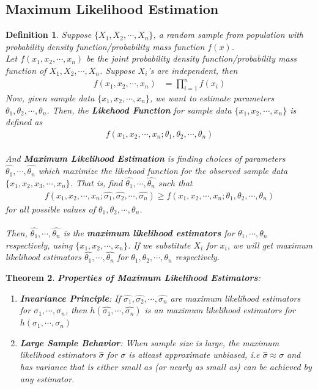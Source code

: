 \documentclass[11pt,oneside]{book}
\theoremstyle{newStyle}
\newtheorem{thm}{Theorem}[chapter]
\newtheorem{defn}[thm]{Definition}
\begin{document}
\subsection[Maximum Likelihood Estimation]{Maximum Likelihood Estimation}
\begin{defn}
Suppose $\{X_1,X_2,\cdots,X_n\}$, a random sample from population with probability density function/probability mass function $f(x)$.\\
Let $f(x_1,x_2,\cdots,x_n)$ be the joint probability density function/probability mass function of $X_1,X_2,\cdots,X_n$. Suppose $X_i$'s are independent, then \begin{align*}
f(x_1,x_2,\cdots,x_n)&=\prod_{i=1}^nf(x_i)
\end{align*} 
Now, given sample data $\{x_1,x_2,\cdots,x_n\}$, we want to estimate parameters $\theta_1,\theta_2,\cdots,\theta_n$. Then, the \textbf{Likehood Function} for sample data $\{x_1,x_2,\cdots,x_n\}$ is defined as \begin{align*}
f(x_1,x_2,\cdots,x_n;\theta_1,\theta_2,\cdots,\theta_n)
\end{align*}
\hfill\\
And \textbf{Maximum Likelihood Estimation} is finding choices of parameters $\widehat{\theta_1},\cdots,\widehat{\theta_n}$ which maximize the likehood function for the observed sample data $\{x_1,x_2,x_3,\cdots,x_n\}$. That is, find $\widehat{\theta_1},\cdots,\widehat{\theta_n}$ such that \begin{align*}
f(x_1,x_2,\cdots,x_n;\widehat{\sigma_1},\widehat{\sigma_2},\cdots,\widehat{\sigma_n})\geq f(x_1,x_2,\cdots,x_n;\theta_1,\theta_2,\cdots,\theta_n)
\end{align*}
for all possible values of $\theta_1,\theta_2,\cdots,\theta_n$.\\
\hfill\\
Then, $\widehat{\theta_1},\cdots,\widehat{\theta_n}$ is the \textbf{maximum likelihood estimators} for $\theta_1,\cdots,\theta_n$ respectively, using $\{x_1,x_2,\cdots,x_n\}$. If we substitute $X_i$ for $x_i$, we will get maximum likelihood estimators $\widehat{\theta_1},\cdots,\widehat{\theta_n}$ for $\theta_1,\theta_2,\cdots,\theta_n$ respectively.
\end{defn}
\begin{thm}
\textbf{Properties of Maximum Likelihood Estimators}:\begin{enumerate}
\item \textbf{Invariance Principle}: If $\widehat{\sigma_1},\widehat{\sigma_2},\cdots, \widehat{\sigma_n}$ are maximum likelihood estimators for $\sigma_1,\cdots,\sigma_n$, then $h(\widehat{\sigma_1},\cdots,\widehat{\sigma_n})$ is an maximum likelihood estimators for $h(\sigma_1,\cdots,\sigma_n)$
\item \textbf{Large Sample Behavior}: When sample size is large, the maximum likelihood estimators $\widehat{\sigma}$ for $\sigma$ is atleast approximate unbiased, i.e $\widehat{\sigma}\approx \sigma$ and has variance that is either small as (or nearly as small as) can be achieved by any estimator.
\end{enumerate}
\end{thm}
\end{document}
